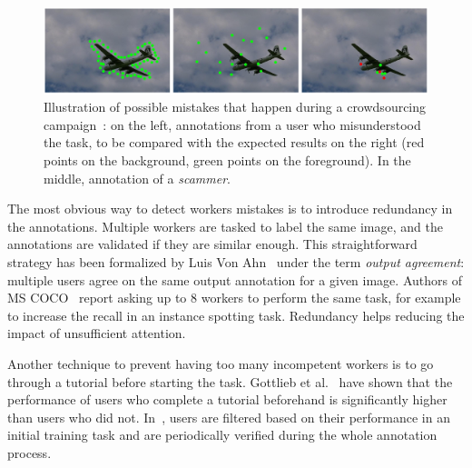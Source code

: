 \begin{figure}[ht]
\centering
\includegraphics[width=\columnwidth]{assets/img/crowdsourcing-errors.png}
\caption{Illustration of possible mistakes that happen during
	a crowdsourcing campaign~\cite{carlier2016assessment}:
	on the left, annotations from a user who misunderstood the task,
	to be compared with the expected results on the right
	(red points on the background, green points on the foreground).
	In the middle, annotation of a \textit{scammer}.}%
\label{fig:cs-errors}
\end{figure}

The most obvious way to detect workers mistakes
is to introduce redundancy in the annotations.
Multiple workers are tasked to label the same image,
and the annotations are validated if they are similar enough.
This straightforward strategy has been formalized by Luis Von Ahn~\cite{von2008designing}
under the term \textit{output agreement}:
multiple users agree on the same output annotation for a given image.
Authors of MS COCO~\cite{lin2014microsoft}
report asking up to 8 workers to perform the same task,
for example to increase the recall in an instance spotting task.
Redundancy helps reducing the impact of unsufficient attention.


Another technique to prevent
having too many incompetent workers is
to go through a tutorial before starting the task.
Gottlieb et al.~\cite{gottlieb2012pushing} have shown
that the performance of users who complete a tutorial beforehand
is significantly higher than users who did not.
In~\cite{lin2014microsoft}, users are filtered
based on their performance in an initial training task
and are periodically verified during the whole annotation process.


